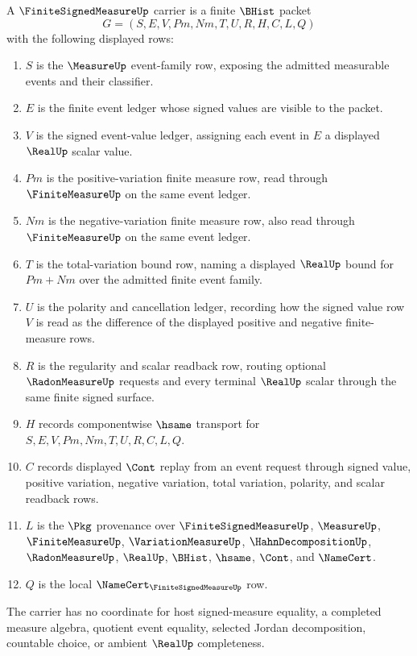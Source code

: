 \begin{definition}
\label{def:finite-signed-measure-carrier}
A $\FiniteSignedMeasureUp$ carrier is a finite $\BHist$ packet
$$
G=(S,E,V,Pm,Nm,T,U,R,H,C,L,Q)
$$
with the following displayed rows:
\begin{enumerate}
\item $S$ is the $\MeasureUp$ event-family row, exposing the admitted measurable events and their classifier.
\item $E$ is the finite event ledger whose signed values are visible to the packet.
\item $V$ is the signed event-value ledger, assigning each event in $E$ a displayed $\RealUp$ scalar value.
\item $Pm$ is the positive-variation finite measure row, read through $\FiniteMeasureUp$ on the same event ledger.
\item $Nm$ is the negative-variation finite measure row, also read through $\FiniteMeasureUp$ on the same event ledger.
\item $T$ is the total-variation bound row, naming a displayed $\RealUp$ bound for $Pm+Nm$ over the admitted finite event family.
\item $U$ is the polarity and cancellation ledger, recording how the signed value row $V$ is read as the difference of the displayed positive and negative finite-measure rows.
\item $R$ is the regularity and scalar readback row, routing optional $\RadonMeasureUp$ requests and every terminal $\RealUp$ scalar through the same finite signed surface.
\item $H$ records componentwise $\hsame$ transport for $S,E,V,Pm,Nm,T,U,R,C,L,Q$.
\item $C$ records displayed $\Cont$ replay from an event request through signed value, positive variation, negative variation, total variation, polarity, and scalar readback rows.
\item $L$ is the $\Pkg$ provenance over $\FiniteSignedMeasureUp$, $\MeasureUp$, $\FiniteMeasureUp$, $\VariationMeasureUp$, $\HahnDecompositionUp$, $\RadonMeasureUp$, $\RealUp$, $\BHist$, $\hsame$, $\Cont$, and $\NameCert$.
\item $Q$ is the local $\NameCert_{\FiniteSignedMeasureUp}$ row.
\end{enumerate}
The carrier has no coordinate for host signed-measure equality, a completed measure algebra, quotient event equality, selected Jordan decomposition, countable choice, or ambient $\RealUp$ completeness.
\end{definition}

